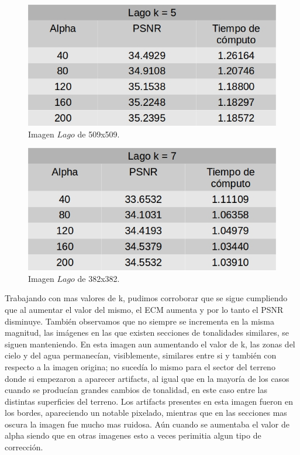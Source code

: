 \documentclass[a4paper]{article}
\begin{document}
    
        \begin{figure}[H]
    \centering
    \includegraphics[scale=0.4]{imagenes/lago5.jpg}
    \caption{Imagen $Lago$ de 509x509.}
	\label{lagoe}
    \end{figure}
    
    
        \begin{figure}[H]
    \centering
    \includegraphics[scale=0.4]{imagenes/lago7.jpg}
    \caption{Imagen $Lago$ de 382x382.}
	\label{lagoe}
    \end{figure}
    
    
Trabajando con mas valores de k, pudimos corroborar que se sigue cumpliendo que al aumentar el valor del mismo, el ECM aumenta y por lo tanto el PSNR disminuye. También observamos que no siempre se incrementa en la misma magnitud, las imágenes en las que existen secciones de tonalidades similares, se siguen manteniendo. En esta imagen aun aumentando el valor de k, las zonas del cielo y del agua permanecían, visiblemente, similares entre si y también con respecto a la imagen origina; no sucedía lo mismo para el sector del terreno donde si empezaron a aparecer artifacts, al igual que en la mayoría de los casos cuando se producían grandes cambios de tonalidad, en este caso entre las distintas superficies del terreno. Los artifacts presentes en esta imagen fueron en los bordes, apareciendo un notable pixelado, mientras que en las secciones mas oscura la imagen fue mucho mas ruidosa. Aún cuando se aumentaba el valor de alpha siendo que en otras imagenes esto a veces perimitia algun tipo de corrección.   
    
\end{document}
